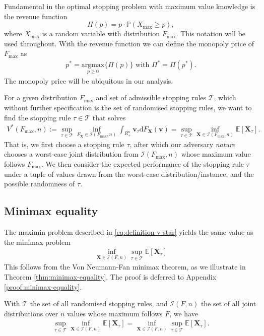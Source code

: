 \documentclass[11pt,a4paper]{article}
\numberwithin{equation}{section}
\begin{document}
Fundamental in the optimal stopping problem with maximum value knowledge is the revenue function 
$$
    \Pi(p)=p\cdot\mathbb{P}(X_{\max}\ge p),
$$
where $X_{\max}$ is a random variable with distribution $F_{\max}$. This notation will be used throughout. With the revenue function we can define the monopoly price of $F_{\max}$ as
\begin{align}
    p^*=\underset{p\ge 0}{\mathrm{argmax}}\{\Pi(p)\}\text{ with }  \Pi^* = \Pi(p^*).
    \label{eq:monopoly_price}
\end{align}
The monopoly price will be ubiquitous in our analysis. 



For a given distribution $F_{\max}$ and set of admissible stopping rules $\mathcal{T}$, which without further specification is the set of randomised stopping rules, we want to find the stopping rule $\tau \in \mathcal{T}$ that solves
\begin{align}
    V^*(F_{\max}, n):=\sup_{\tau\in\mathcal{T}}\inf_{F_{\boldsymbol{X}}\in\mathcal{I}(F_{\max}, n)}\int_{R^n_+}\boldsymbol{v}_{\tau}\mathrm{d}F_{\boldsymbol{X}}(\boldsymbol{v})=\sup_{\tau\in\mathcal{T}}\inf_{\boldsymbol{X}\in\mathcal{I}(F_{\max}, n)}\mathbb{E}[\boldsymbol{X}_{\tau}].\label{eq:definition-v-star}
\end{align}
That is, we first choose a stopping rule $\tau$, after which our adversary \textit{nature} chooses a worst-case joint distribution from $\mathcal{I}(F_{\max},n)$ whose maximum value follows $F_{\max}$. We then consider the expected performance of the stopping rule $\tau$ under a tuple of values drawn from the worst-case distribution/instance, and the possible randomness of $\tau$. 
\subsection{Minimax equality}
The maximin problem described in \eqref{eq:definition-v-star} yields the same value as the minimax problem 
\begin{align}
    \inf_{\boldsymbol{X}\in\mathcal{I}(F, n)}\sup_{\tau\in\mathcal{T}}\mathbb{E}[\boldsymbol{X}_{\tau}] \label{eq:minimax-v-star}
\end{align}
This follows from the Von Neumann-Fan minimax theorem, as we illustrate in Theorem \ref{thm:minimax-equality}. The proof is deferred to Appendix \ref{proof:minimax-equality}.




\begin{theorem}
With $\mathcal{T}$ the set of all randomised stopping rules, and $\mathcal{I}(F,n)$ the set of all joint distributions over $n$ values whose maximum follows $F$, we have
\label{thm:minimax-equality}
\begin{align}   \sup_{\tau\in\mathcal{T}}\inf_{\boldsymbol{X}\in\mathcal{I}(F, n)}\mathbb{E}[\boldsymbol{X}_{\tau}]=\inf_{\boldsymbol{X}\in\mathcal{I}(F, n)}\sup_{\tau\in\mathcal{T}}\mathbb{E}[\boldsymbol{X}_{\tau}].
\end{align}
\end{theorem}
\end{document}
